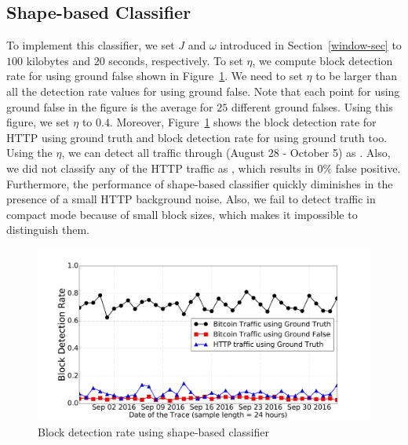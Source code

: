 \subsection{Shape-based Classifier}
To implement this classifier, we set $J$ and $\omega$ introduced in Section~\ref{window-sec} to $100$ kilobytes and $20$ seconds, respectively. 
To set $\eta$, we compute block detection rate for \bc using ground false shown in Figure~\ref{fig:window}. We need to set $\eta$ to be larger than all the detection rate values for \bc using ground false. Note that each point for \bc using ground false in the figure is the average for $25$ different ground falses. Using this figure, we set $\eta$ to $0.4$. Moreover, Figure~\ref{fig:window} shows the block detection rate for HTTP using ground truth and block detection rate for \bc using ground truth too. Using the $\eta$, we can detect all \bc traffic through (August 28 - October 5) as \bc. Also, we did not classify any of the HTTP traffic as \bc, which results in $0\%$ false positive. Furthermore, the performance of shape-based classifier quickly diminishes in the presence of a small HTTP background noise. Also, we fail to detect \bc traffic in compact mode because of small block sizes, which makes it impossible to distinguish them.

 


\begin{figure}
\centering
\includegraphics[scale=0.15]{image/jan25/window.pdf}%
\caption{Block detection rate using shape-based classifier}
\label{fig:window}
\end{figure}
